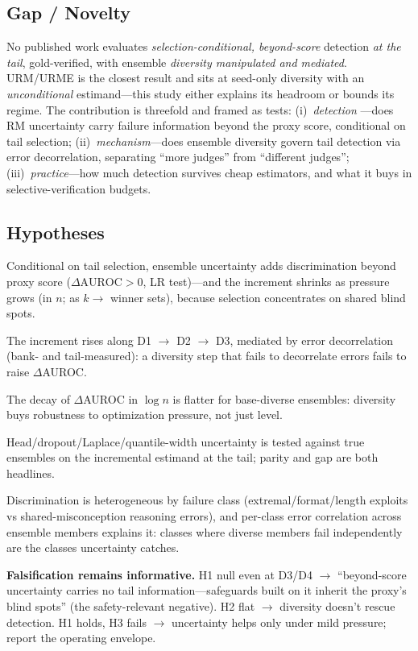\documentclass[11pt]{article}
\begin{document}
\subsection{Gap / Novelty}
No published work evaluates \emph{selection-conditional, beyond-score} detection
\emph{at the tail}, gold-verified, with ensemble \emph{diversity manipulated and
mediated}. URM/URME is the closest result and sits at seed-only diversity with an
\emph{unconditional} estimand---this study either explains its headroom or bounds
its regime. The contribution is threefold and framed as tests: (i)~\emph{detection}
---does RM uncertainty carry failure information beyond the proxy score, conditional
on tail selection; (ii)~\emph{mechanism}---does ensemble diversity govern tail
detection via error decorrelation, separating ``more judges'' from ``different
judges''; (iii)~\emph{practice}---how much detection survives cheap estimators, and
what it buys in selective-verification budgets.

\subsection{Hypotheses}
\begin{description}[leftmargin=0em,itemsep=3pt]
  \item[H1 (incremental tail discrimination).] Conditional on tail selection,
    ensemble uncertainty adds discrimination beyond proxy score
    ($\Delta\text{AUROC}>0$, LR test)---and the increment shrinks as pressure grows
    (in $n$; as $k \to$ winner sets), because selection concentrates on shared
    blind spots.
  \item[H2 (diversity, mediated).] The increment rises along D1 $\to$ D2 $\to$ D3,
    mediated by error decorrelation (bank- and tail-measured): a diversity step that
    fails to decorrelate errors fails to raise $\Delta$AUROC.
  \item[H3 (pressure $\times$ diversity).] The decay of $\Delta$AUROC in $\log n$ is
    flatter for base-diverse ensembles: diversity buys robustness to optimization
    pressure, not just level.
  \item[H4 (cheap uncertainty).] Head/dropout/Laplace/quantile-width uncertainty is
    tested against true ensembles on the incremental estimand at the tail; parity and
    gap are both headlines.
  \item[H5 (failure taxonomy $+$ mechanism).] Discrimination is heterogeneous by
    failure class (extremal/format/length exploits vs shared-misconception reasoning
    errors), and per-class error correlation across ensemble members explains it:
    classes where diverse members fail independently are the classes uncertainty
    catches.
\end{description}
\textbf{Falsification remains informative.} H1 null even at D3/D4 $\to$
``beyond-score uncertainty carries no tail information---safeguards built on it
inherit the proxy's blind spots'' (the safety-relevant negative). H2 flat $\to$
diversity doesn't rescue detection. H1 holds, H3 fails $\to$ uncertainty helps only
under mild pressure; report the operating envelope.
\end{document}
